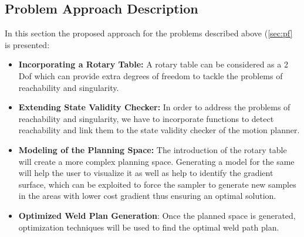 \subsection{Problem Approach Description}
In this section the proposed approach for the problems described above (\ref{sec:pf} is presented:

\begin{itemize}
\item \textbf{Incorporating a Rotary Table:} A rotary table can be considered as a 2 Dof which can provide extra degrees of freedom to tackle the problems of reachability and singularity. 
\item \textbf{Extending State Validity Checker:} In order to address the problems of reachability and singularity, we have to incorporate functions to detect reachability and link them to the state validity checker of the motion planner.
\item \textbf{Modeling of the Planning Space:} The introduction of the rotary table will create a more complex planning space. Generating a model for the same will help the user to visualize it as well as help to identify the gradient surface, which can be exploited to force the sampler to generate new samples in the areas with lower cost gradient thus ensuring an optimal solution.
\item \textbf{Optimized Weld Plan Generation}: Once the planned space is generated, optimization techniques will be used to find the optimal weld path plan.
\end{itemize}